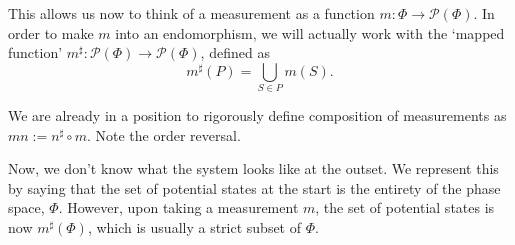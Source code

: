 \documentclass{article}
\theoremstyle{definition}
\newcommand{\ps}{\mathcal{P}}
\begin{document}
This allows us now to think of a measurement as a function $m : \Phi \to \ps(\Phi)$. In order to make $m$ into an endomorphism, we will actually work with the `mapped function' $m^\sharp : \ps(\Phi) \to \ps(\Phi)$, defined as
\[m^\sharp(P) = \bigcup_{S \in P} m(S).\]

We are already in a position to rigorously define composition of measurements as $mn := n^\sharp \circ m$. Note the order reversal.

Now, we don't know what the system looks like at the outset. We represent this by saying that the set of potential states at the start is the entirety of the phase space, $\Phi$. However, upon taking a measurement $m$, the set of potential states is now $m^\sharp(\Phi)$, which is usually a strict subset of $\Phi$.

{}

\end{document}
